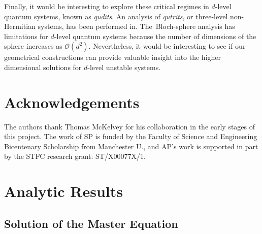 \documentclass[12pt,a4paper]{article}
\renewcommand{\thesubsection}{\arabic{section}.\arabic{subsection}}
\renewcommand{\theequation}{\arabic{section}.\arabic{equation}}
\begin{document}
Finally, it would be interesting to explore these critical regimes in $d$-level quantum systems, known as {\em qudits}. An analysis of {\em qutrits}, or three-level non-Hermitian systems, has been performed in\cite{Kowalski:2020vrx}. The~Bloch-sphere analysis has limitations for $d$-level quantum systems because the number of dimensions  of the sphere increases as $\mathcal{O}(d^2)$. Nevertheless, it would be interesting to see if our geometrical constructions can provide valuable insight into the higher dimensional solutions for $d$-level unstable systems.

\section*{Acknowledgements}
The authors thank Thomas McKelvey for his collaboration in the early stages of this project.
The work of SP is funded by the Faculty of Science and Engineering Bicentenary Scholarship from Manchester U., and AP's work is supported in part by the STFC research grant: ST/X00077X/1. 

\noindent

\newpage

\appendix
\renewcommand{\thesubsection}{\Alph{section}.\arabic{subsection}}
\renewcommand{\theequation}{\Alph{section}.\arabic{equation}}

\section{Analytic Results}\label{App:CUQgensol}

\subsection{Solution of the Master Equation}
\end{document}
